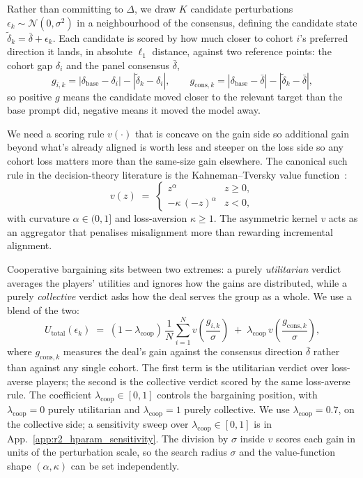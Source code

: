 \documentclass{article}
\begin{document}
Rather than committing to $\Delta$, we draw $K$ candidate
perturbations $\epsilon_k \sim \mathcal{N}(0, \sigma^2)$ in a
neighbourhood of the consensus, defining the candidate state
$\tilde\delta_k = \bar\delta + \epsilon_k$. Each candidate is scored
by how much closer to cohort $i$'s preferred direction it lands,
in absolute $\ell_1$ distance, against two reference points: the
cohort gap $\delta_i$ and the panel consensus $\bar\delta$,
\begin{equation}
g_{i,k} = |\delta_{\text{base}} - \delta_i| - |\tilde\delta_k - \delta_i|, \qquad
g_{\text{cons},k} = |\delta_{\text{base}} - \bar\delta| - |\tilde\delta_k - \bar\delta|,
\label{eq:gains}
\end{equation}
so positive $g$ means the candidate moved closer to the relevant
target than the base prompt did, negative means it moved the
model away.


We need a scoring rule $v(\cdot)$ that is concave on the gain 
side so additional gain beyond what's already aligned is worth 
less and steeper on the loss side so any cohort loss matters 
more than the same-size gain elsewhere. The canonical such rule 
in the decision-theory literature is the 
Kahneman--Tversky value function~\citep{kahneman1979prospect, 
tversky1992advances}:
\begin{equation}
v(z) \;=\; 
\begin{cases} z^{\alpha} & z \geq 0, \\ -\kappa\,(-z)^{\alpha} & z < 0, \end{cases}
\label{eq:pt-utility}
\end{equation}
with curvature $\alpha \in (0, 1]$ and loss-aversion 
$\kappa \geq 1$. The asymmetric kernel $v$ acts as an aggregator that penalises misalignment more than rewarding 
incremental alignment.

Cooperative bargaining sits between two extremes: a purely 
\emph{utilitarian} verdict averages the players' utilities and 
ignores how the gains are distributed, while a purely 
\emph{collective} verdict asks how the deal serves the group as 
a whole. We use a blend of the two:
\begin{equation}
U_{\text{total}}(\epsilon_k) 
\;=\; (1 - \lambda_{\text{coop}})\,\frac{1}{N}\sum_{i=1}^{N} 
       v\!\left(\frac{g_{i,k}}{\sigma}\right) 
\;+\; \lambda_{\text{coop}}\,
       v\!\left(\frac{g_{\text{cons},k}}{\sigma}\right),
\label{eq:util_total}
\end{equation}
where $g_{\text{cons},k}$ measures the deal's gain against the 
consensus direction $\bar\delta$ rather than against any single cohort. The first term is the utilitarian verdict over loss-averse players; 
the second is the collective verdict scored by the same 
loss-averse rule. The coefficient $\lambda_{\text{coop}} \in 
[0,1]$ controls the bargaining position, with 
$\lambda_{\text{coop}} = 0$ purely utilitarian and 
$\lambda_{\text{coop}} = 1$ purely collective. We use
$\lambda_{\text{coop}} = 0.7$, on the collective side; a sensitivity sweep over $\lambda_{\text{coop}} \in [0,1]$ is in
App.~\ref{app:r2_hparam_sensitivity}. The
division by $\sigma$ inside $v$ scores each gain in units of the
perturbation scale, so the search radius $\sigma$ and the
value-function shape $(\alpha, \kappa)$ can be set independently.
\end{document}
